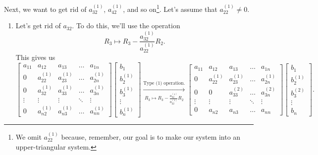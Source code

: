 \documentclass[letterpaper]{article}
\newcommand{\0}{\mathbf{0}}
\begin{document}
Next, we want to get rid of $a_{32}^{(1)}$, $a_{42}^{(1)}$, and so on\footnote{We omit $a_{22}^{(1)}$ because, remember, our goal is to make our system into an upper-triangular system.}. Let's assume that $a_{22}^{(1)} \neq 0$.

\begin{enumerate}
    \item Let's get rid of $a_{32}$. To do this, we'll use the operation
    \[R_3 \mapsto R_3 - \frac{a_{32}^{(1)}}{a_{22}^{(1)}} R_2.\]
    This gives us 
    \[\begin{bmatrix}
        a_{11} & a_{12} & a_{13} & \hdots & a_{1n} \\ 
        0      & a_{22}^{(1)} & a_{23}^{(1)} & \hdots & a_{2n}^{(1)} \\ 
        0      & a_{32}^{(1)} & a_{33}^{(1)} & \hdots & a_{3n}^{(1)} \\ 
        \vdots & \vdots & \vdots & \ddots & \vdots \\ 
        0      & a_{n2}^{(1)} & a_{n3}^{(1)} & \hdots & a_{nn}^{(1)}
    \end{bmatrix} \begin{bmatrix}
        b_1 \\ b_2^{(1)} \\ b_3^{(1)} \\ \vdots \\ b_n^{(1)}
    \end{bmatrix} \xrightarrow[R_3 \mapsto R_3 - \frac{a_{32}^{(1)}}{a_{22}^{(1)}} R_2]{\text{Type (1) operation.}} \begin{bmatrix}
        a_{11} & a_{12} & a_{13} & \hdots & a_{1n} \\ 
        0      & a_{22}^{(1)} & a_{23}^{(1)} & \hdots & a_{2n}^{(1)} \\ 
        0      & 0       & a_{33}^{(2)} & \hdots & a_{3n}^{(2)} \\ 
        \vdots & \vdots & \vdots & \ddots & \vdots \\ 
        0      & a_{n2} & a_{n3} & \hdots & a_{nn}
    \end{bmatrix} \begin{bmatrix}
        b_1 \\ b_2^{(1)} \\ b_3^{(2)} \\ \vdots \\ b_n
    \end{bmatrix}.\]


\end{enumerate}
\end{document}
